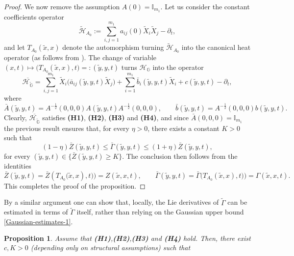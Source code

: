 \documentclass[11pt,a4paper]{article}
\newtheorem{proposition}[theorem]{\bf Proposition}
\numberwithin{equation}{section}
\def \tt {\tilde}
\def \GG {{\mathbb{G}}}
\def \p {\partial}
\def \H {\mathscr{H}_\GG}
\def \HG {\mathscr{H}_{\tilde\GG}}
\def \G {{\Gamma}}
\def \y {{\eta}}
\begin{document}
{{\begin{proof}
	We now remove the assumption $A(0)=\mathbb{I}_{m_1}$. Let us consider the constant coefficients operator
	\begin{equation}
		\tt{\mathscr{H}}_{A_0}:=\sum_{i,j=1}^{m_1}a_{ij}(0)\tt X_i\tt X_j-\p_t,
	\end{equation} 
	and let $T_{A_0}(\tt x,x)$ denote the automorphism turning $\tt{\mathscr{H}}_{A_0}$ into the canonical heat operator (as follows from \cite{bonfiglioli2004families}). The change of variable $(x,t)\mapsto\big(T_{A_0}(\tt x,x),t\big)=:(\tt y,y,t)$ turns $\H$ into the operator
	\begin{equation}\label{Santa Maria del focallo}
		\overline{\HG} =\sum_{i,j=1}^{m_1} \tt X_i\big(\bar a_{ij}(\tt y,y,t)\tt X_j\big) + \sum_{i=1}^{m_1} \bar b_i(\tt y,y,t)\tt X_i+ c(\tt y,y,t)-\p_t ,
	\end{equation}
	where
	\begin{equation}
		\bar A (\tt y,y,t)=A^{-\frac{1}{2}}(0,0,0)A(\tt y,y,t)A^{-\frac{1}{2}}(0,0,0),\qquad \bar b(\tt y,y,t) = A^{-\frac{1}{2}}(0,0,0) b(\tt y,y,t).
	\end{equation}
	Clearly, $\overline{\HG}$ satisfies \textbf{(H1)}, \textbf{(H2)}, \textbf{(H3)} and \textbf{(H4)}, and since $\bar A (0,0,0)=\mathbb{I}_{m_1}$ the previous result ensures that, for every $\eta >0$, there exists a constant $K>0$ such that
	\begin{equation}
		(1-\y) \bar Z(\tt y,y,t)\leq \bar \G(\tt y,y,t)\leq (1+\y)\bar Z(\tt y,y,t),
	\end{equation}
	for every $(\tt y,y,t)\in \Big\{\bar Z(\tt y,y,t)\geq K\Big\}$. The conclusion then follows from the identities
	\begin{equation}
		\bar Z(\tt y,y,t)=\bar Z(T_{A_0}\big(\tt x,x),t)\big)= Z(\tt x,x,t),\qquad \bar \G(\tt y,y,t)=\bar \G\big(T_{A_0}(\tt x,x),t)\big)= \G(\tt x,x,t).
	\end{equation} 
	This completes the proof of the proposition.
\end{proof}
By a similar argument one can show that, locally, the Lie derivatives of $\tt\G$ can be estimated in terms of $\tt\G$ itself, rather than relying on the Gaussian upper bound \eqref{Gaussian-estimates-1}.
\begin{proposition}\label{Bound-derivative}	
	Assume that \textbf{(H1)},\textbf{(H2)},\textbf{(H3)} and \textbf{(H4)} hold. Then, there exist $c,K>0$ (depending only on structural assumptions) such that 
	\begin{equation}\label{bound-derivative}
		\begin{aligned}

\end{aligned}
\end{equation}
\end{proposition}}}
\end{document}
